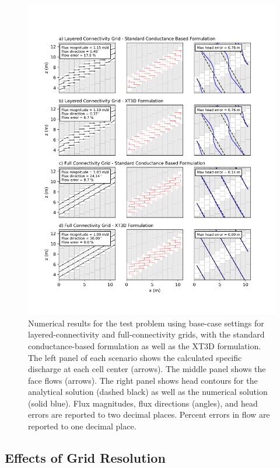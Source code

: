 \documentclass{article}
\begin{document}
\begin{figure}[p!]
	\begin{center}
	\includegraphics[scale=0.75]{../figures/fig2_paper.png}
	\caption{Numerical results for the test problem using base-case settings for layered-connectivity and full-connectivity grids, with the standard conductance-based formulation as well as the XT3D formulation. The left panel of each scenario shows the calculated specific discharge at each cell center (arrows). The middle panel shows the face flows (arrows). The right panel shows head contours for the analytical solution (dashed black) as well as the numerical solution (solid blue). Flux magnitudes, flux directions (angles), and head errors are reported to two decimal places. Percent errors in flow are reported to one decimal place.}
	\label{fig:fig2}
	\end{center}
\end{figure}

\subsection*{Effects of Grid Resolution}
\end{document}
